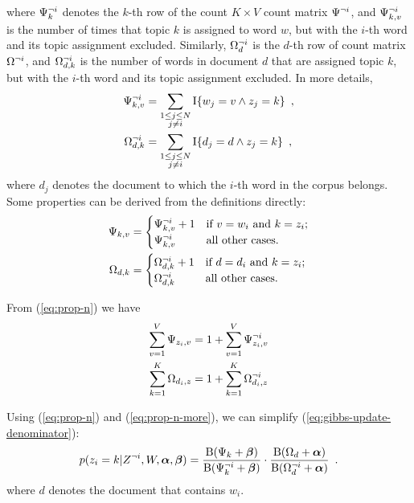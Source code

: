 where $\Psi_{k}^{\neg i}$ denotes the $k$-th row of the count $K\times{}V$
count matrix $\Psi_{}^{\neg i}$, and $\Psi_{k,v}^{\neg i}$ is the number of
times that topic $k$ is assigned to word $w$, but with the $i$-th word
and its topic assignment excluded.  Similarly, $\Omega_{d}^{\neg i}$ is
the $d$-th row of count matrix $\Omega_{}^{\neg i}$, and
$\Omega_{d,k}^{\neg i}$ is the number of words in document $d$ that are
assigned topic $k$, but with the $i$-th word and its topic assignment
excluded.  In more details,
\begin{equation}
  \label{eq:ni-t-z}
  \begin{split}
    \Psi_{k,v}^{\neg i} &= \sum_{\substack{1\leq{}j\leq{}N \\j\neq{}i}} \operatorname{I}\{w_j=v \land z_j=k \}
    \enspace, \\
    \Omega_{d,k}^{\neg i} &= \sum_{\substack{1\leq{}j\leq{}N \\j\neq{}i}} \operatorname{I}\{d_j=d \land z_j=k \}
    \enspace,
  \end{split}
\end{equation}
where $d_j$ denotes the document to which the $i$-th word in the
corpus belongs.  Some properties can be derived from the definitions
directly:
\begin{equation}
  \label{eq:prop-n}
  \begin{split}
    \Psi_{k,v} &=
    \begin{cases}
      \Psi_{k,v}^{\neg i} + 1 & \text{if $v=w_i$ and $k=z_i$;} \\
      \Psi_{k,v}^{\neg i}     & \text{all other cases.}
    \end{cases}
    \\
    \Omega_{d,k} &=
    \begin{cases}
      \Omega_{d,k}^{\neg i} + 1 & \text{if $d=d_i$ and $k=z_i$;} \\
      \Omega_{d,k}^{\neg i}     & \text{all other cases.}
    \end{cases}
  \end{split}
\end{equation}

From (\ref{eq:prop-n}) we have
\begin{equation}
  \label{eq:prop-n-more}
  \begin{split}
    \sum_{v=1}^{V} \Psi_{z_i,v}
    &=
    1 + \sum_{v=1}^{V} \Psi_{z_i,v}^{\neg i}
    \\
    \sum_{k=1}^{K} \Omega_{d_i,z}
    &=
    1 + \sum_{k=1}^{K} \Omega_{d_i,z}^{\neg i}
  \end{split}
\end{equation}

Using (\ref{eq:prop-n}) and (\ref{eq:prop-n-more}), we can simplify
(\ref{eq:gibbs-update-denominator}):
\begin{equation}
  \label{eq:gibbs-update-2}
  p(z_i=k|Z^{\neg i},W,\boldsymbol{\alpha},\boldsymbol{\beta})
  =
  \frac{
    \operatorname{B}( \Psi_{k} + \boldsymbol{\beta} )
  }{
    \operatorname{B}( \Psi_{k}^{\neg i} + \boldsymbol{\beta} )
  }
  \cdot
  \frac{
    \operatorname{B}( \Omega_{d} + \boldsymbol{\alpha} )
  }{
    \operatorname{B}( \Omega_{d}^{\neg i} + \boldsymbol{\alpha} )
  }
  \enspace.
\end{equation}
where $d$ denotes the document that contains $w_i$.

